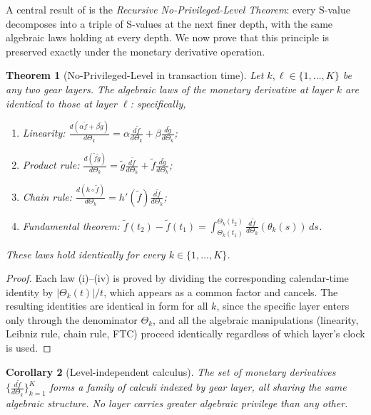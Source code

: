 \documentclass[twocolumn,11pt,a4paper]{article}
\theoremstyle{thmstyle}
\newtheorem{theorem}{Theorem}[section]
\newtheorem{corollary}[theorem]{Corollary}
\theoremstyle{definition}
\theoremstyle{remark}
\newcommand{\Clock}{\Theta}                  %
\newcommand{\InvClock}{\theta}               %
\newcommand{\MdiffK}[2]{\frac{d#1}{d\Clock_{#2}}} %
\begin{document}
A central result of \citet{Sachikonye2024S} is the
\emph{Recursive No-Privileged-Level Theorem}: every
S-value decomposes into a triple of S-values at the next
finer depth, with the same algebraic laws holding at every
depth.  We now prove that this principle is preserved
exactly under the monetary derivative operation.

\begin{theorem}[No-Privileged-Level in transaction time]
\label{thm:npl}
Let $k,\ell\in\{1,\ldots,K\}$ be any two gear layers.
The algebraic laws of the monetary derivative at layer $k$
are identical to those at layer $\ell$: specifically,
\begin{enumerate}[nosep,label=(\roman*)]
\item \emph{Linearity:} $\MdiffK{(\alpha\tilde{f}+\beta\tilde{g})}{k}
      = \alpha\MdiffK{\tilde{f}}{k}+\beta\MdiffK{\tilde{g}}{k}$;
\item \emph{Product rule:}
      $\MdiffK{(\tilde{f}\tilde{g})}{k}
       = \tilde{g}\MdiffK{\tilde{f}}{k}
         +\tilde{f}\MdiffK{\tilde{g}}{k}$;
\item \emph{Chain rule:}
      $\MdiffK{(h\circ\tilde{f})}{k}
       = h'(\tilde{f})\MdiffK{\tilde{f}}{k}$;
\item \emph{Fundamental theorem:}
      $\tilde{f}(t_{2})-\tilde{f}(t_{1})
       = \int_{\Clock_{k}(t_{1})}^{\Clock_{k}(t_{2})}
         \MdiffK{\tilde{f}}{k}(\InvClock_{k}(s))\,ds$.
\end{enumerate}
These laws hold identically for every $k\in\{1,\ldots,K\}$.
\end{theorem}

\begin{proof}
Each law (i)--(iv) is proved by dividing the corresponding
calendar-time identity by $|\Clock_{k}(t)|/t$, which
appears as a common factor and cancels.  The resulting
identities are identical in form for all $k$, since the
specific layer enters only through the denominator
$\Clock_{k}$, and all the algebraic manipulations
(linearity, Leibniz rule, chain rule, FTC) proceed
identically regardless of which layer's clock is used.
\end{proof}

\begin{corollary}[Level-independent calculus]\label{cor:level-indep}
The set of monetary derivatives $\{\MdiffK{\tilde{f}}{k}\}_{k=1}^{K}$
forms a family of calculi indexed by gear layer, all
sharing the same algebraic structure.  No layer carries
greater algebraic privilege than any other.
\end{corollary}
\end{document}
